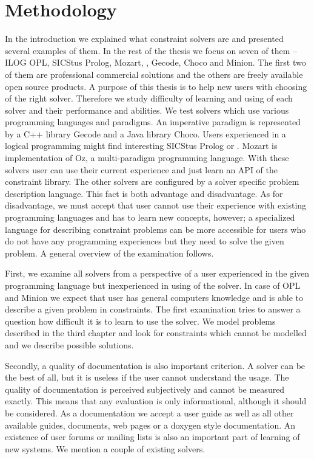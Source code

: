 \chapter{Methodology}
\thispagestyle{myheadings}

In the introduction we explained what constraint solvers are and presented several 
examples of them. In the rest of the thesis we focus on seven of them -- ILOG 
OPL, SICStus Prolog, Mozart, \eclipse, Gecode, Choco and Minion. The first two of them are 
professional commercial solutions and the others are freely available open source 
products. A purpose of this thesis is to help new users with choosing of the right solver. 
Therefore we study difficulty of learning and using of each solver and their 
performance and abilities. We test solvers which use various programming languages 
and paradigms. An imperative paradigm is represented by a C++ library Gecode and a Java 
library Choco. Users experienced in a logical programming might find interesting 
SICStus Prolog or \eclipse. Mozart is implementation of Oz, a multi-paradigm 
programming language. With these solvers user can use their current experience and 
just learn an API of the constraint library. The other solvers are configured by 
a solver specific problem description language. This fact is both advantage and disadvantage. 
As for disadvantage, we must accept that user cannot use their experience with 
existing programming languages and has to learn new concepts, however; a specialized 
language for describing constraint problems can be more accessible for users who 
do not have any programming experiences but they need to solve the given problem.
A general overview of the examination follows.

First, we examine all solvers from a perspective of a user experienced in the given 
programming language but inexperienced in using of the solver. In case of OPL 
and Minion we expect that user has general computers knowledge and is able 
to describe a given problem in constraints. The first examination tries to answer 
a question how difficult it is to learn to use the solver. We model problems 
described in the third chapter and look for constraints which cannot be modelled 
and we describe possible solutions. 

Secondly, a quality of documentation is also important criterion. A solver can be 
the best of all, but it is useless if the user cannot understand the usage. 
The quality of documentation is perceived subjectively and cannot be measured 
exactly. This means that any evaluation is only informational, although it should be 
considered. As a documentation we accept a user guide as well as all other available 
guides, documents, web pages or a doxygen style documentation. An existence of user 
forums or mailing lists is also an important part of learning of new systems. We 
mention a couple of existing solvers. 

